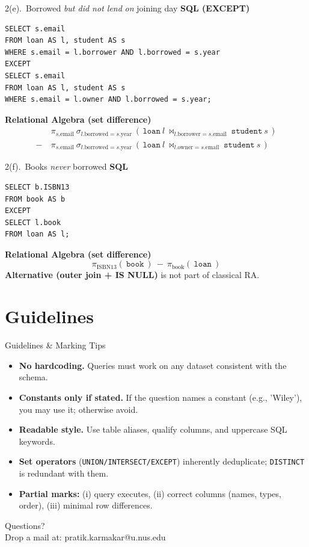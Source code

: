 \documentclass{beamer}
\begin{document}
\begin{frame}[fragile]{2(e).\ Borrowed \emph{but did not lend} \emph{on} joining day}
\small
\textbf{SQL (EXCEPT)}
\begin{lstlisting}
SELECT s.email
FROM loan AS l, student AS s
WHERE s.email = l.borrower AND l.borrowed = s.year
EXCEPT
SELECT s.email
FROM loan AS l, student AS s
WHERE s.email = l.owner AND l.borrowed = s.year;
\end{lstlisting}

\small
\textbf{Relational Algebra (set difference)}
\[
\begin{aligned}
&\pi_{s.\text{email}}\ \sigma_{l.\text{borrowed}=s.\text{year}}\ (\,\texttt{loan}\ l\ \bowtie_{l.\text{borrower}=s.\text{email}}\ \texttt{student}\ s\,)\\
-\ &\pi_{s.\text{email}}\ \sigma_{l.\text{borrowed}=s.\text{year}}\ (\,\texttt{loan}\ l\ \bowtie_{l.\text{owner}=s.\text{email}}\ \texttt{student}\ s\,)
\end{aligned}
\]
\end{frame}

\begin{frame}[fragile]{2(f).\ Books \emph{never} borrowed}
\small
\textbf{SQL}
\begin{lstlisting}
SELECT b.ISBN13
FROM book AS b
EXCEPT
SELECT l.book
FROM loan AS l;
\end{lstlisting}

\small
\textbf{Relational Algebra (set difference)}
\[
\pi_{\text{ISBN13}}(\ \texttt{book}\ )\ -\ \pi_{\text{book}}(\ \texttt{loan}\ )
\]
\medskip
\textbf{Alternative (outer join + IS NULL)} is not part of classical RA.
\end{frame}

\section{Guidelines}
\begin{frame}{Guidelines \& Marking Tips}
\small
\begin{itemize}\itemsep4pt
  \item \textbf{No hardcoding.} Queries must work on any dataset consistent with the schema.
  \item \textbf{Constants only if stated.} If the question names a constant (e.g., 'Wiley'), you may use it; otherwise avoid.
  \item \textbf{Readable style.} Use table aliases, qualify columns, and uppercase SQL keywords.
  \item \textbf{Set operators} (\texttt{UNION/INTERSECT/EXCEPT}) inherently deduplicate; \texttt{DISTINCT} is redundant with them.
  \item \textbf{Partial marks:} (i) query executes, (ii) correct columns (names, types, order), (iii) minimal row differences.
\end{itemize}
\end{frame}

\begin{frame}
\begin{center}
Questions?\\
Drop a mail at: pratik.karmakar@u.nus.edu
\end{center}
\end{frame}
\end{document}
